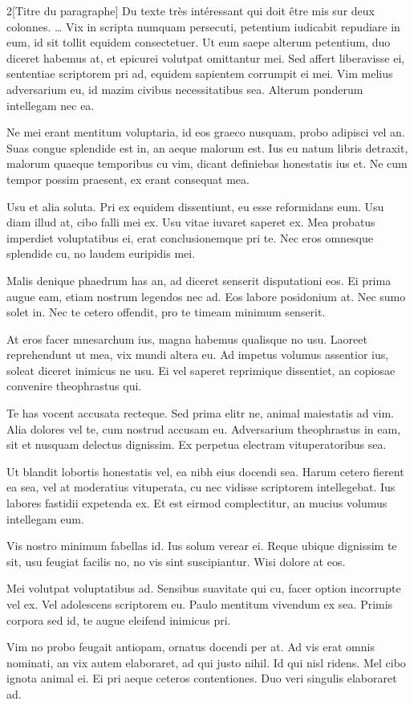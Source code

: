\documentclass[a4paper,8pt]{article}
\begin{document}
\begin{multicols}{2}[Titre du paragraphe]
  Du texte très intéressant qui doit être mis sur deux colonnes.
  \ldots
  Vix in scripta numquam persecuti, petentium iudicabit repudiare in eum, id sit tollit equidem consectetuer. Ut eum saepe alterum petentium, duo diceret habemus at, et epicurei volutpat omittantur mei. Sed affert liberavisse ei, sententiae scriptorem pri ad, equidem sapientem corrumpit ei mei. Vim melius adversarium eu, id mazim civibus necessitatibus sea. Alterum ponderum intellegam nec ea.

Ne mei erant mentitum voluptaria, id eos graeco nusquam, probo adipisci vel an. Suas congue splendide est in, an aeque malorum est. Ius eu natum libris detraxit, malorum quaeque temporibus cu vim, dicant definiebas honestatis ius et. Ne cum tempor possim praesent, ex erant consequat mea.

Usu et alia soluta. Pri ex equidem dissentiunt, eu esse reformidans eum. Usu diam illud at, cibo falli mei ex. Usu vitae iuvaret saperet ex. Mea probatus imperdiet voluptatibus ei, erat conclusionemque pri te. Nec eros omnesque splendide cu, no laudem euripidis mei.

Malis denique phaedrum has an, ad diceret senserit disputationi eos. Ei prima augue eam, etiam nostrum legendos nec ad. Eos labore posidonium at. Nec sumo solet in. Nec te cetero offendit, pro te timeam minimum senserit.

At eros facer mnesarchum ius, magna habemus qualisque no usu. Laoreet reprehendunt ut mea, vix mundi altera eu. Ad impetus volumus assentior ius, soleat diceret inimicus ne usu. Ei vel saperet reprimique dissentiet, an copiosae convenire theophrastus qui.

Te has vocent accusata recteque. Sed prima elitr ne, animal maiestatis ad vim. Alia dolores vel te, cum nostrud accusam eu. Adversarium theophrastus in eam, sit et nusquam delectus dignissim. Ex perpetua electram vituperatoribus sea.

Ut blandit lobortis honestatis vel, ea nibh eius docendi sea. Harum cetero fierent ea sea, vel at moderatius vituperata, cu nec vidisse scriptorem intellegebat. Ius labores fastidii expetenda ex. Et est eirmod complectitur, an mucius volumus intellegam eum.

Vis nostro minimum fabellas id. Ius solum verear ei. Reque ubique dignissim te sit, usu feugiat facilis no, no vis sint suscipiantur. Wisi dolore at eos.

Mei volutpat voluptatibus ad. Sensibus suavitate qui cu, facer option incorrupte vel ex. Vel adolescens scriptorem eu. Paulo mentitum vivendum ex sea. Primis corpora sed id, te augue eleifend inimicus pri.

Vim no probo feugait antiopam, ornatus docendi per at. Ad vis erat omnis nominati, an vix autem elaboraret, ad qui justo nihil. Id qui nisl ridens. Mel cibo ignota animal ei. Ei pri aeque ceteros contentiones. Duo veri singulis elaboraret ad.
\end{multicols}
\end{document}
